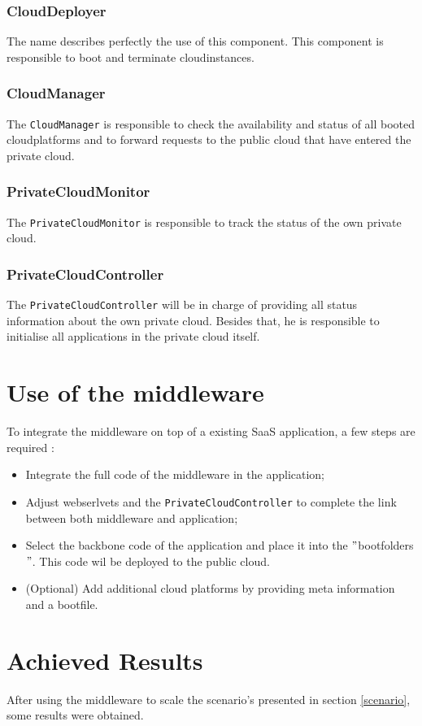 \documentclass[journal]{IEEEtran}
\begin{document}
\subsubsection{CloudDeployer}
The name describes perfectly the use of this component.
This component is responsible to boot and terminate cloudinstances.
\subsubsection{CloudManager}
The \texttt{CloudManager} is responsible to check the availability and status of all booted cloudplatforms and to forward requests to the public cloud that have entered the private cloud.
\subsubsection{PrivateCloudMonitor}
The \texttt{PrivateCloudMonitor} is responsible to track the status of the own private cloud.
\subsubsection{PrivateCloudController}
The \texttt{PrivateCloudController} will be in charge of providing all status information about the own private cloud.
Besides that, he is responsible to initialise all applications in the private cloud itself.\newline

\section{Use of the middleware}
To integrate the middleware on top of a existing SaaS application, a few steps are required :
\begin{itemize}
    \item Integrate the full code of the middleware in the application;
    \item Adjust webserlvets and the \texttt{PrivateCloudController} to complete the link between both middleware and application;
    \item Select the backbone code of the application and place it into the $"$bootfolders$"$.  This code wil be deployed to the public cloud.
    \item (Optional) Add additional cloud platforms by providing meta information and a bootfile.
\end{itemize}

\section{Achieved Results}
After using the middleware to scale the scenario's presented in section \ref{scenario}, some results were obtained.\newline
\end{document}
